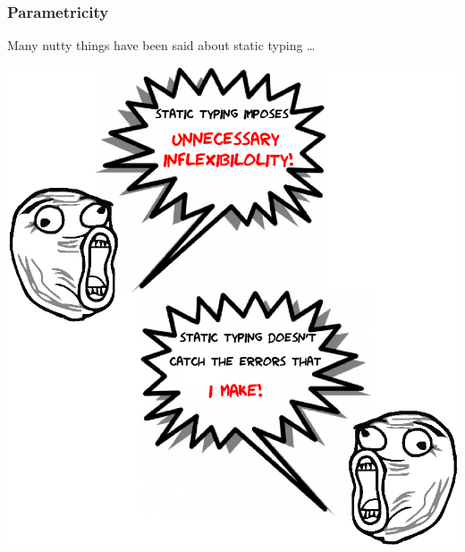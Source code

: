\begin{frame}
\frametitle{Parametricity}
\begin{center}
Many nutty things have been said about static typing \ldots
\end{center}
\begin{center}
\includegraphics[width=0.5\paperwidth]{image/static-typing-nutty.png}
\end{center}
\end{frame}

